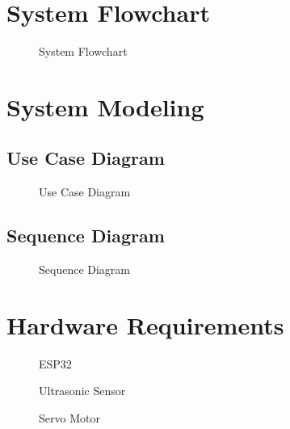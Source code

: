\documentclass[12pt,a4paper]{report}
\begin{document}
\section{System Flowchart}

\begin{figure}[ht]
\centering
\vspace{6cm}
\caption{System Flowchart}
\end{figure}

\section{System Modeling}

\subsection{Use Case Diagram}

\begin{figure}[ht]
\centering
\vspace{6cm}
\caption{Use Case Diagram}
\end{figure}

\subsection{Sequence Diagram}

\begin{figure}[ht]
\centering
\vspace{6cm}
\caption{Sequence Diagram}
\end{figure}

\section{Hardware Requirements}


\begin{figure}[ht]
\centering
\vspace{5cm}
\caption{ESP32}
\end{figure}

\begin{figure}[ht]
\centering
\vspace{5cm}
\caption{Ultrasonic Sensor}
\end{figure}

\begin{figure}[ht]
\centering
\vspace{5cm}
\caption{Servo Motor}
\end{figure}
\end{document}
